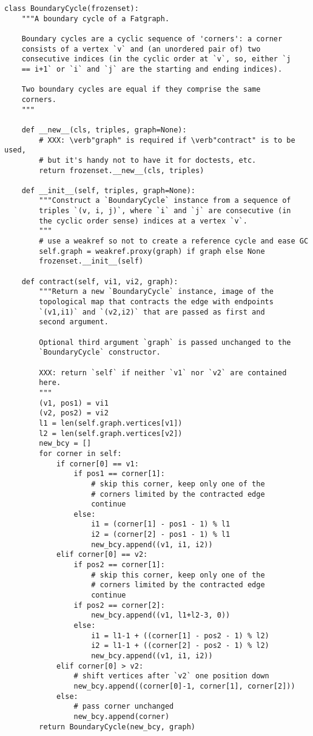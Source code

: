 \begin{lstlisting}
class BoundaryCycle(frozenset):
    """A boundary cycle of a Fatgraph.

    Boundary cycles are a cyclic sequence of 'corners': a corner
    consists of a vertex `v` and (an unordered pair of) two
    consecutive indices (in the cyclic order at `v`, so, either `j
    == i+1` or `i` and `j` are the starting and ending indices).

    Two boundary cycles are equal if they comprise the same
    corners.
    """

    def __new__(cls, triples, graph=None):
        # XXX: \verb"graph" is required if \verb"contract" is to be used,
        # but it's handy not to have it for doctests, etc.
        return frozenset.__new__(cls, triples)

    def __init__(self, triples, graph=None):
        """Construct a `BoundaryCycle` instance from a sequence of
        triples `(v, i, j)`, where `i` and `j` are consecutive (in
        the cyclic order sense) indices at a vertex `v`.
        """
        # use a weakref so not to create a reference cycle and ease GC
        self.graph = weakref.proxy(graph) if graph else None
        frozenset.__init__(self)

    def contract(self, vi1, vi2, graph):
        """Return a new `BoundaryCycle` instance, image of the
        topological map that contracts the edge with endpoints
        `(v1,i1)` and `(v2,i2)` that are passed as first and
        second argument.

        Optional third argument `graph` is passed unchanged to the
        `BoundaryCycle` constructor.

        XXX: return `self` if neither `v1` nor `v2` are contained
        here.
        """
        (v1, pos1) = vi1
        (v2, pos2) = vi2
        l1 = len(self.graph.vertices[v1])
        l2 = len(self.graph.vertices[v2])
        new_bcy = []
        for corner in self:
            if corner[0] == v1:
                if pos1 == corner[1]:
                    # skip this corner, keep only one of the
                    # corners limited by the contracted edge
                    continue
                else: 
                    i1 = (corner[1] - pos1 - 1) % l1
                    i2 = (corner[2] - pos1 - 1) % l1
                    new_bcy.append((v1, i1, i2))
            elif corner[0] == v2:
                if pos2 == corner[1]:
                    # skip this corner, keep only one of the
                    # corners limited by the contracted edge
                    continue
                if pos2 == corner[2]:
                    new_bcy.append((v1, l1+l2-3, 0))
                else:
                    i1 = l1-1 + ((corner[1] - pos2 - 1) % l2)
                    i2 = l1-1 + ((corner[2] - pos2 - 1) % l2)
                    new_bcy.append((v1, i1, i2))
            elif corner[0] > v2:
                # shift vertices after `v2` one position down
                new_bcy.append((corner[0]-1, corner[1], corner[2]))
            else:
                # pass corner unchanged
                new_bcy.append(corner)
        return BoundaryCycle(new_bcy, graph)



\end{lstlisting}
